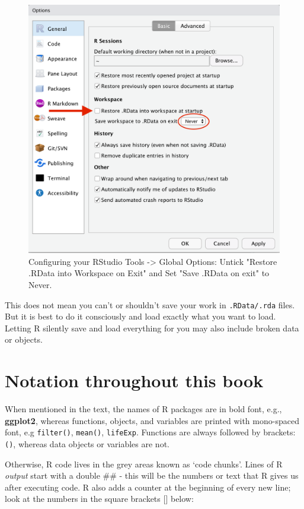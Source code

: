 \documentclass[
  12pt,
  krantz2]{krantz}
\begin{document}
\begin{figure}
\includegraphics[width=1\linewidth]{images/chapter01/rstudio_settings} \caption{Configuring your RStudio Tools -> Global Options:  Untick "Restore .RData into Workspace on Exit" and Set "Save .RData on exit" to Never.}\label{fig:chap01-fig-settings}
\end{figure}

This does not mean you can't or shouldn't save your work in \texttt{.RData/.rda} files.
But it is best to do it consciously and load exactly what you want to load.
Letting R silently save and load everything for you may also include broken data or objects.

\hypertarget{notation-throughout-this-book}{%
\section{Notation throughout this book}\label{notation-throughout-this-book}}

When mentioned in the text, the names of R packages are in bold font, e.g., \textbf{ggplot2}, whereas functions, objects, and variables are printed with mono-spaced font, e.g \texttt{filter()}, \texttt{mean()}, \texttt{lifeExp}. Functions are always followed by brackets: \texttt{()}, whereas data objects or variables are not.

Otherwise, R code lives in the grey areas known as `code chunks'.
Lines of R \emph{output} start with a double \#\# - this will be the numbers or text that R gives us after executing code.
R also adds a counter at the beginning of every new line; look at the numbers in the square brackets {[}{]} below:
\end{document}
